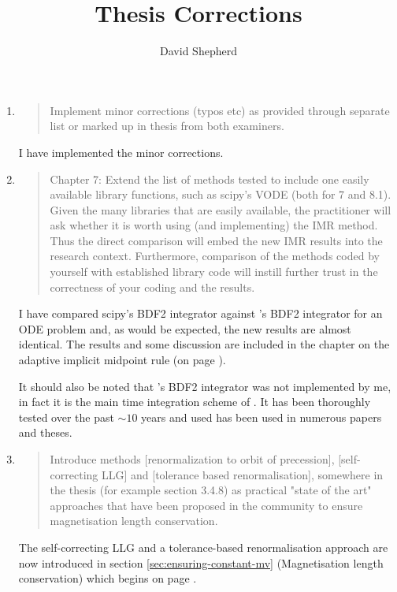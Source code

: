 \documentclass[12pt,a4paper,pdftex]{article}
\title{Thesis Corrections}
\author{David Shepherd}
\begin{document}
\maketitle


\begin{enumerate}
\item
  \begin{quotation}
    Implement minor corrections (typos etc) as provided through
    separate list or marked up in thesis from both examiners.
  \end{quotation}
  I have implemented the minor corrections.

\item
  \begin{quotation}
    Chapter 7: Extend the list of methods tested to include one easily
    available library functions, such as scipy's VODE (both for 7 and
    8.1). Given the many libraries that are easily available, the
    practitioner will ask whether it is worth using (and implementing) the
    IMR method. Thus the direct comparison will embed the new IMR results
    into the research context. Furthermore, comparison of the methods
    coded by yourself with established library code will instill further
    trust in the correctness of your coding and the results.
  \end{quotation}
  I have compared scipy's \vode BDF2 integrator against \oomph's BDF2 integrator for an ODE problem and, as would be expected, the new results are almost identical. The results and some discussion are included in the chapter on the adaptive implicit midpoint rule (on page \pageref{fig:vode-osc-example}).

  It should also be noted that \oomph's BDF2 integrator was not implemented by me, in fact it is the main time integration scheme of \oomph.
  It has been thoroughly tested over the past $\sim 10$ years and used has been used in numerous papers and theses.

\item
  \begin{quotation}
    Introduce methods [renormalization to orbit of precession],
    [self-correcting LLG] and [tolerance based renormalisation], somewhere
    in the thesis (for example section 3.4.8) as practical "state of the
    art" approaches that have been proposed in the community to ensure
    magnetisation length conservation.
  \end{quotation}
  The self-correcting LLG and a tolerance-based renormalisation approach are now introduced in section \ref{sec:ensuring-constant-mv} (Magnetisation length conservation) which begins on page \pageref{alt-ml-renorm-intro}.


\end{enumerate}
\end{document}
